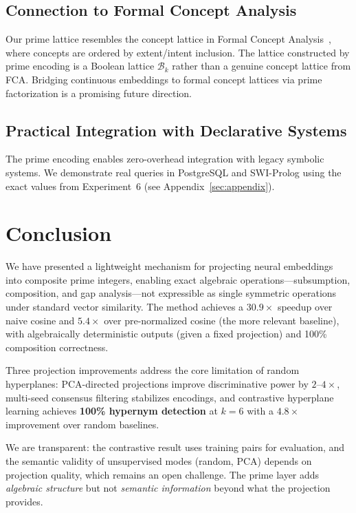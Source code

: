 \documentclass[10pt]{article}
\begin{document}
\subsection{Connection to Formal Concept Analysis}

Our prime lattice resembles the concept lattice in Formal Concept Analysis~\cite{ganter1999formal}, where concepts are ordered by extent/intent inclusion. The lattice constructed by prime encoding is a Boolean lattice $\mathcal{B}_k$ rather than a genuine concept lattice from FCA. Bridging continuous embeddings to formal concept lattices via prime factorization is a promising future direction.

\subsection{Practical Integration with Declarative Systems}

The prime encoding enables zero-overhead integration with legacy symbolic systems. We demonstrate real queries in PostgreSQL and SWI-Prolog using the exact values from Experiment~6 (see Appendix~\ref{sec:appendix}).

\section{Conclusion}

We have presented a lightweight mechanism for projecting neural embeddings into composite prime integers, enabling exact algebraic operations---subsumption, composition, and gap analysis---not expressible as single symmetric operations under standard vector similarity. The method achieves a $30.9\times$ speedup over naive cosine and $5.4\times$ over pre-normalized cosine (the more relevant baseline), with algebraically deterministic outputs (given a fixed projection) and 100\% composition correctness.

Three projection improvements address the core limitation of random hyperplanes: PCA-directed projections improve discriminative power by $2$--$4\times$, multi-seed consensus filtering stabilizes encodings, and contrastive hyperplane learning achieves \textbf{100\% hypernym detection} at $k\!=\!6$ with a $4.8\times$ improvement over random baselines.

We are transparent: the contrastive result uses training pairs for evaluation, and the semantic validity of unsupervised modes (random, PCA) depends on projection quality, which remains an open challenge. The prime layer adds \emph{algebraic structure} but not \emph{semantic information} beyond what the projection provides.
\end{document}
